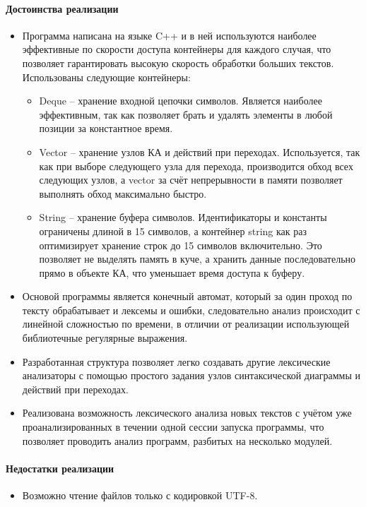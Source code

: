 \documentclass[a4paper,final]{article}
\begin{document}
\paragraph{Достоинства реализации}
\begin{itemize}
    \item Программа написана на языке C++ и в ней используются наиболее эффективные по скорости доступа контейнеры для каждого случая, что позволяет гарантировать высокую скорость обработки больших текстов. Использованы следующие контейнеры:
    \begin{itemize}
        \item Deque -- хранение входной цепочки символов. Является наиболее эффективным, так как позволяет брать и удалять элементы в любой позиции за константное время.
        \item Vector -- хранение узлов КА и действий при переходах. Используется, так как при выборе следующего узла для перехода, производится обход всех следующих узлов, а vector за счёт непрерывности в памяти позволяет выполнять обход максимально быстро.
        \item String -- хранение буфера символов. Идентификаторы и константы ограничены длиной в 15 символов, а контейнер string как раз оптимизирует хранение строк до 15 символов включительно. Это позволяет не выделять память в куче, а хранить данные последовательно прямо в объекте КА, что уменьшает время доступа к буферу. 
    \end{itemize}
    \item Основой программы является конечный автомат, который за один проход по тексту обрабатывает и лексемы и ошибки, следовательно анализ происходит с линейной сложностью по времени, в отличии от реализации использующей библиотечные регулярные выражения.
    \item Разработанная структура позволяет легко создавать другие лексические анализаторы с помощью простого задания узлов синтаксической диаграммы и действий при переходах.
    \item Реализована возможность лексического анализа новых текстов с учётом уже проанализированных в течении одной сессии запуска программы, что позволяет проводить анализ программ, разбитых на несколько модулей.
\end{itemize}
\paragraph{Недостатки реализации}
\begin{itemize}
    \item Возможно чтение файлов только с кодировкой UTF-8.
\end{itemize}
\end{document}
